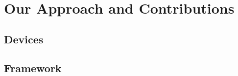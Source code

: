 \documentclass[ucs,10pt]{beamer}
\begin{document}
% 	
% 	
%	


\section{Our Approach and Contributions}
\subsection{Devices}
\subsection{Framework}
\end{document}
